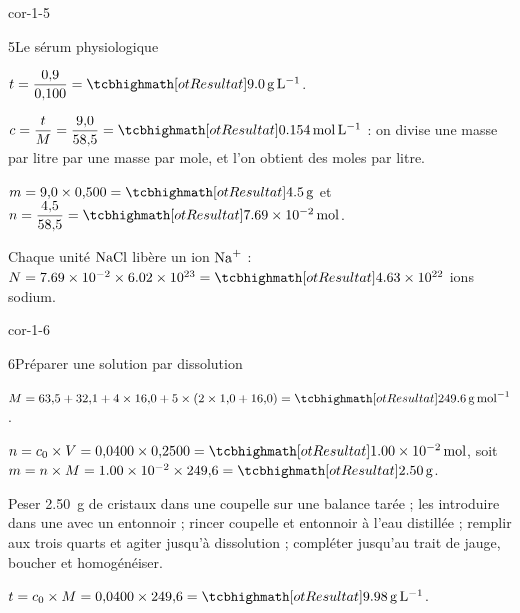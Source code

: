 \begin{blocLivre}{cor-1-5}
\begin{corrige}{5}{Le sérum physiologique}
\begin{questions}
\item $t=\dfrac{0{,}9}{0{,}100}=\res{\qty{9,0}{g.L^{-1}}}$.
\item $c=\dfrac{t}{M}=\dfrac{9{,}0}{58{,}5}=\res{\qty{0,154}{mol.L^{-1}}}$ : on divise une masse par litre par une masse par mole, et l'on obtient des moles
par litre.
\item $m=9{,}0\times0{,}500=\res{\qty{4,5}{g}}$ et $n=\dfrac{4{,}5}{58{,}5}=\res{\qty{7,69e-2}{mol}}$.
\item Chaque unité $\ce{NaCl}$ libère un ion $\ce{Na+}$ : $N=\num{7.69e-2}\times\num{6.02e23}=\res{\num{4.63e22}}$ ions sodium.
\end{questions}
\end{corrige}
\end{blocLivre}
\begin{blocLivre}{cor-1-6}
\begin{corrige}{6}{Préparer une solution par dissolution}
\begin{questions}
\item $M=63{,}5+32{,}1+4\times16{,}0+5\times(2\times1{,}0+16{,}0)=\res{\qty{249,6}{g.mol^{-1}}}$.
\item $n=c_0\times V=0{,}0400\times0{,}2500=\res{\qty{1,00e-2}{mol}}$, soit $m=n\times M=\num{1.00e-2}\times249{,}6=\res{\qty{2,50}{g}}$.
\item Peser \qty{2,50}{g} de cristaux dans une coupelle sur une balance tarée ; les introduire dans une 
avec un entonnoir ; rincer coupelle et entonnoir à l'eau distillée ; remplir aux trois quarts et agiter jusqu'à
dissolution ; compléter jusqu'au trait de jauge, boucher et homogénéiser.
\item $t=c_0\times M=0{,}0400\times249{,}6=\res{\qty{9,98}{g.L^{-1}}}$.
\end{questions}
\end{corrige}
\end{blocLivre}

